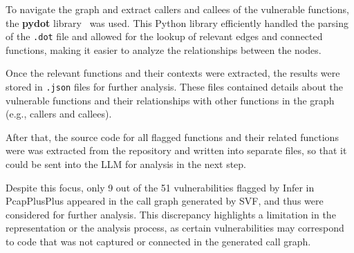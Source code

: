 To navigate the graph and extract callers and callees of the vulnerable functions, the \textbf{pydot} library~\cite{pydot} was used. This Python library efficiently handled the parsing of the \texttt{.dot} file and allowed for the lookup of relevant edges and connected functions, making it easier to analyze the relationships between the nodes.

Once the relevant functions and their contexts were extracted, the results were stored in \texttt{.json} files for further analysis. These files contained details about the vulnerable functions and their relationships with other functions in the graph (e.g., callers and callees). 

After that, the source code for all flagged functions and their related functions were was extracted from the repository and written into separate files, so that it could be sent into the LLM for analysis in the next step.

Despite this focus, only 9 out of the 51 vulnerabilities flagged by Infer in PcapPlusPlus appeared in the call graph generated by SVF, and thus were considered for further analysis. This discrepancy highlights a limitation in the representation or the analysis process, as certain vulnerabilities may correspond to code that was not captured or connected in the generated call graph.
